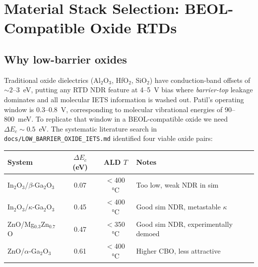 \documentclass[11pt,a4paper,onecolumn]{article}
\newcommand{\code}[1]{\texttt{\small #1}}
\begin{document}
\section{Material Stack Selection: BEOL-Compatible Oxide RTDs}
\label{sec:stack}

\subsection{Why low-barrier oxides}
Traditional oxide dielectrics (Al$_2$O$_3$, HfO$_2$, SiO$_2$) have
conduction-band offsets of $\sim\!2$--3~eV, putting any RTD NDR feature at
4--5~V bias where \emph{barrier-top} leakage dominates and all molecular
IETS information is washed out. Patil's operating window is 0.3--0.8~V,
corresponding to molecular vibrational energies of 90--800~meV. To
replicate that window in a BEOL-compatible oxide we need
$\Delta E_c \sim 0.5$~eV. The systematic literature search in
\code{docs/LOW\_BARRIER\_OXIDE\_IETS.md} identified four viable oxide pairs:
\begin{center}
\small
\begin{tabular}{lccl}
\toprule
System & $\Delta E_c$ (eV) & ALD $T$ & Notes\\
\midrule
In$_2$O$_3$/$\beta$-Ga$_2$O$_3$      & 0.07 & $<$400\,\si{\celsius} & Too low, weak NDR in sim\\
In$_2$O$_3$/$\kappa$-Ga$_2$O$_3$     & 0.45 & $<$400\,\si{\celsius} & Good sim NDR, metastable $\kappa$\\
ZnO/Mg$_{0.3}$Zn$_{0.7}$O             & 0.47 & $<$350\,\si{\celsius} & Good sim NDR, experimentally demoed\\
ZnO/$\alpha$-Ga$_2$O$_3$              & 0.61 & $<$400\,\si{\celsius} & Higher CBO, less attractive\\
\bottomrule
\end{tabular}
\end{center}
\end{document}
